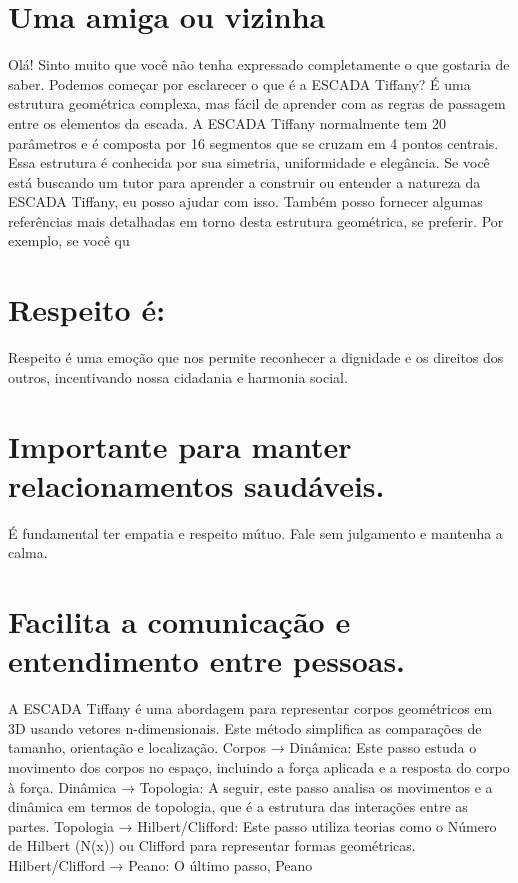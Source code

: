 \documentclass[11pt,a4paper]{article}
\begin{document}
\section{Uma amiga ou vizinha}
Olá! Sinto muito que você não tenha expressado completamente o que gostaria de saber. Podemos começar por esclarecer o que é a ESCADA Tiffany? É uma estrutura geométrica complexa, mas fácil de aprender com as regras de passagem entre os elementos da escada. A ESCADA Tiffany normalmente tem 20 parâmetros e é composta por 16 segmentos que se cruzam em 4 pontos centrais. Essa estrutura é conhecida por sua simetria, uniformidade e elegância. Se você está buscando um tutor para aprender a construir ou entender a natureza da ESCADA Tiffany, eu posso ajudar com isso. Também posso fornecer algumas referências mais detalhadas em torno desta estrutura geométrica, se preferir. Por exemplo, se você qu

\section{Respeito é:}
Respeito é uma emoção que nos permite reconhecer a dignidade e os direitos dos outros, incentivando nossa cidadania e harmonia social.

\section{Importante para manter relacionamentos saudáveis.}
É fundamental ter empatia e respeito mútuo. Fale sem julgamento e mantenha a calma.

\section{Facilita a comunicação e entendimento entre pessoas.}
A ESCADA Tiffany é uma abordagem para representar corpos geométricos em 3D usando vetores n-dimensionais. Este método simplifica as comparações de tamanho, orientação e localização. Corpos → Dinâmica: Este passo estuda o movimento dos corpos no espaço, incluindo a força aplicada e a resposta do corpo à força. Dinâmica → Topologia: A seguir, este passo analisa os movimentos e a dinâmica em termos de topologia, que é a estrutura das interações entre as partes. Topologia → Hilbert/Clifford: Este passo utiliza teorias como o Número de Hilbert (N(x)) ou Clifford para representar formas geométricas. Hilbert/Clifford → Peano: O último passo, Peano
\end{document}
